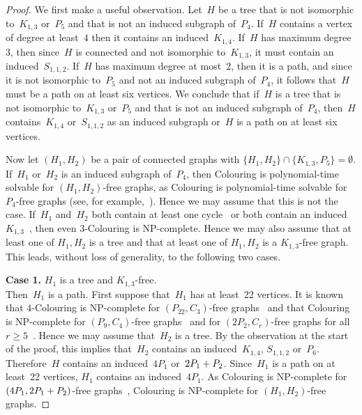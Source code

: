\documentclass{llncs}
\newcommand{\NP}{{\sf NP}}
\begin{document}
\begin{proof}
We first make a useful observation.
Let~$H$ be a tree that is not isomorphic to~$K_{1,3}$ or~$P_5$ and that is not an induced subgraph of~$P_4$.
If~$H$ contains a vertex of degree at least~$4$ then it contains an induced~$K_{1,4}$.
If~$H$ has maximum degree~$3$, then since~$H$ is connected and not isomorphic to~$K_{1,3}$, it must contain an induced~$S_{1,1,2}$.
If~$H$ has maximum degree at most~$2$, then it is a path, and since it is not isomorphic to~$P_5$ and not an induced subgraph of~$P_4$, it follows that~$H$ must be a path on at least six vertices.
We conclude that if~$H$ is a tree that is not isomorphic to~$K_{1,3}$ or~$P_5$ and that is not an induced subgraph of~$P_4$, then~$H$ contains~$K_{1,4}$ or~$S_{1,1,2}$ as an induced subgraph or~$H$ is a path on at least six vertices.


\medskip
\noindent
Now let $(H_1,H_2)$ be a pair of connected graphs with $\{H_1,H_2\} \cap \{K_{1,3},P_5\}=\emptyset$.
If~$H_1$ or~$H_2$ is an induced subgraph of~$P_4$, then {\sc Colouring} is polynomial-time solvable for $(H_1,H_2)$-free graphs, as {\sc Colouring} is polynomial-time solvable for $P_4$-free graphs (see, for example,~\cite{KKTW01}).
Hence we may assume that this is not the case.
If~$H_1$ and~$H_2$ both contain at least one cycle~\cite{EHK98} or both contain an induced~$K_{1,3}$~\cite{Ho81}, then even {\sc $3$-Colouring} is \NP-complete.
Hence we may also assume that at least one of $H_1,H_2$ is a tree and that at least one of $H_1,H_2$ is a $K_{1,3}$-free graph.
This leads, without loss of generality, to the following two cases.

\medskip
\noindent
{\bf Case 1.} $H_1$ is a tree and $K_{1,3}$-free.\\
Then~$H_1$ is a path.
First suppose that~$H_1$ has at least~22 vertices.
It is known that {\sc $4$-Colouring} is \NP-complete for $(P_{22},C_3)$-free graphs~\cite{HJP14} and that {\sc Colouring} is \NP-complete for $(P_9,C_4)$-free graphs~\cite{GHP} and for $(2P_2,C_r)$-free graphs for all $r \geq 5$~\cite{KKTW01}.
Hence we may assume that~$H_2$ is a tree.
By the observation at the start of the proof, this implies that~$H_2$ contains an induced~$K_{1,4}$, $S_{1,1,2}$ or~$P_6$.
Therefore~$H$ contains an induced~$4P_1$ or~$2P_1+\nobreak P_2$.
Since~$H_1$ is a path on at least~22 vertices, $H_1$ contains an induced~$4P_1$.
As {\sc Colouring} is \NP-complete for $(4P_1,2P_1+\nobreak P_2)$-free graphs~\cite{KKTW01}, {\sc Colouring} is \NP-complete for $(H_1,H_2)$-free graphs.


\end{proof}
\end{document}
